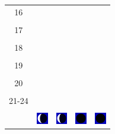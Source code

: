 \documentclass[a4paper,12pt, tikz]{scrartcl}
\begin{document}
\begin{tabularx}{\linewidth}{|c|X|X|p{2cm}|p{2cm}|}
            &   &       &    &   \\
          \hline
          16&   &                 &    &   \\
            &   &       &    &   \\
          \hline
          17&   &                 &    &   \\
            &   &       &    &   \\
          \hline
          18&   &                 &    &   \\
            &   &       &    &   \\
          \hline
          19&   &                 &     &   \\
            &   &       &    &   \\
          \hline
          20&   &              &    &   \\
            &   &       &    &   \\
          \hline 
          21-24&   &              &    &   \\
            &   &       &    &   \\
          \hline
                      & \vspace{0.01cm} \centerline{\includegraphics[width=0.5cm]{moon_phases/Moon_phase_7.svg.png}} \vspace{0.1cm} & \vspace{0.01cm} \centerline{\includegraphics[width=0.5cm]{moon_phases/Moon_phase_7.svg.png}} \vspace{0.1cm} & \vspace{0.01cm} \centerline{\includegraphics[width=0.5cm]{moon_phases/Moon_phase_0.svg.png}} \vspace{0.1cm} & \vspace{0.01cm} \centerline{\includegraphics[width=0.5cm]{moon_phases/Moon_phase_0.svg.png}} \vspace{0.1cm}\\
          \hline    
        \end{tabularx}
\end{document}
